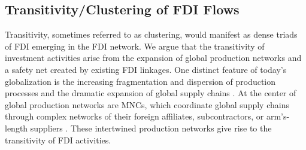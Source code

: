 \documentclass[reqno,onecolumn,letterpaper,12pt]{article}
\begin{document}





\subsection{Transitivity/Clustering of FDI Flows}
Transitivity, sometimes referred to as clustering, would manifest as dense triads of FDI emerging in the FDI network. We argue that the transitivity of investment activities arise from the expansion of global production networks and a safety net created by existing FDI linkages.
One distinct feature of today's globalization is the increasing fragmentation and dispersion of production processes and the dramatic expansion of global supply chains \citep{UNCTAD:2013,Baldwin:2011}. At the center of global production networks are MNCs, which coordinate global supply chains through complex networks of their foreign affiliates, subcontractors, or arm's-length suppliers \citep[xxii]{UNCTAD:2013}. These intertwined production networks give rise to the transitivity of FDI activities.
\end{document}
